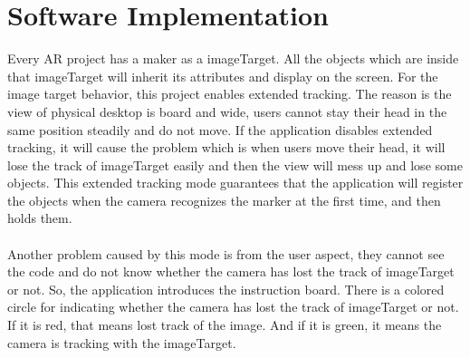 
\chapter{Software Implementation} %

\label{Chapter6} %
Every AR project has a maker as a imageTarget. All the objects which are inside that imageTarget will inherit its attributes and display on the screen. For the image target behavior, this project enables extended tracking. The reason is the view of physical desktop is board and wide, users cannot stay their head in the same position steadily and do not move. If the application disables extended tracking, it will cause the problem which is when users move their head, it will lose the track of imageTarget easily and then the view will mess up and lose some objects. This extended tracking mode guarantees that the application will register the objects when the camera recognizes the marker at the first time, and then holds them. 
\\
\\
Another problem caused by this mode is from the user aspect, they cannot see the code and do not know whether the camera has lost the track of imageTarget or not. So, the application introduces the instruction board. There is a colored circle for indicating whether the camera has lost the track of imageTarget or not. If it is red, that means lost track of the image. And if it is green, it means the camera is tracking with the imageTarget.

